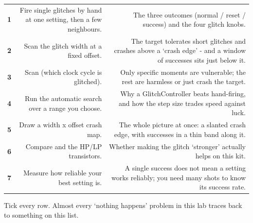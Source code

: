 \documentclass[11pt,letterpaper]{article}
\begin{document}
{\small{}
\begin{longtable}{|R{0.1159}|R{0.3768}|R{0.5072}|}
\hline
{} &  &  \\ \hline
\endhead
\textbf{1} & Fire single glitches by hand at one setting, then a few neighbours. & The three outcomes (normal / reset / success) and the four glitch knobs. \\ \hline
\textbf{2} & Scan the glitch width at a fixed offset. & The target tolerates short glitches and crashes above a `crash edge' - and a window of successes sits just below it. \\ \hline
\textbf{3} & Scan  (which clock cycle is glitched). & Only specific moments are vulnerable; the rest are harmless or just crash the target. \\ \hline
\textbf{4} & Run the automatic search over a range you choose. & Why a GlitchController beats hand-firing, and how the step size trades speed against luck. \\ \hline
\textbf{5} & Draw a width x offset crash map. & The whole picture at once: a slanted crash edge, with successes in a thin band along it. \\ \hline
\textbf{6} & Compare  and the HP/LP transistors. & Whether making the glitch `stronger' actually helps on this kit. \\ \hline
\textbf{7} & Measure how reliable your best setting is. & A single success does not mean a setting works reliably; you need many shots to know its success rate. \\ \hline
\end{longtable}}

\clearpage


Tick every row. Almost every `nothing happens' problem in this lab traces back to something on this list.
\end{document}
